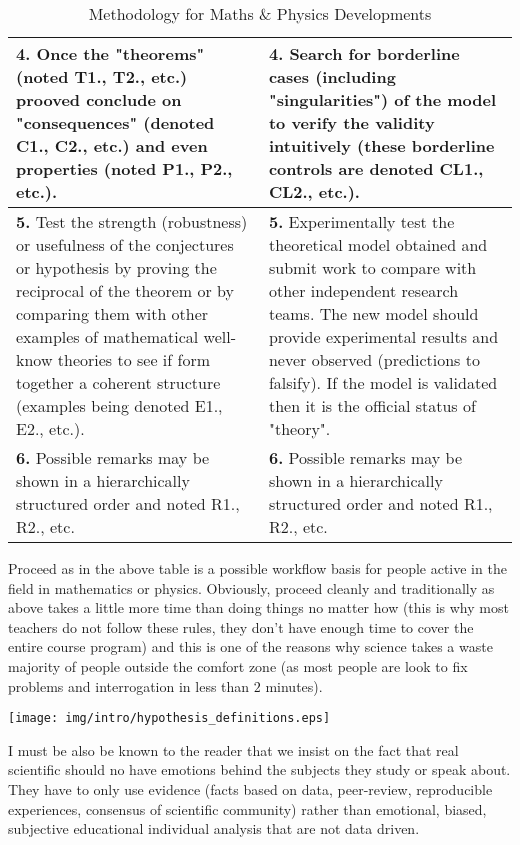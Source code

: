 \begin{table}[!ht]
\begin{center}
\begin{tabular}{|p{7.5cm}|p{7.5cm}|}
				\textbf{4.} Once the "theorems" (noted T1., T2., etc.) prooved conclude on "consequences" (denoted C1., C2., etc.) and even properties (noted P1., P2., etc.). & \textbf{4.} Search for borderline cases (including "singularities") of the model to verify the validity intuitively (these borderline controls are denoted CL1., CL2., etc.).\\ \hline
				\textbf{5.} Test the strength (robustness) or usefulness of the conjectures or hypothesis by proving the reciprocal of the theorem or by comparing them with other examples of mathematical well-know theories to see if form together a coherent structure (examples being denoted E1., E2., etc.). & \textbf{5.} Experimentally test the theoretical model obtained and submit work to compare with other independent research teams. The new model should provide experimental results and never observed (predictions to falsify). If the model is validated then it is the official status of "theory".\\ \hline
				\textbf{6.} Possible remarks may be shown in a hierarchically structured order and noted R1., R2., etc. & \textbf{6.} Possible remarks may be shown in a hierarchically structured order and noted R1., R2., etc.			
				\\ \hline
		\end{tabular}
	\end{center}
	\caption{Methodology for Maths \& Physics Developments}
	\end{table}	
	
Proceed as in the above table is a possible workflow basis for people active in the field in mathematics or physics. Obviously, proceed cleanly and traditionally as above takes a little more time than doing things no matter how (this is why most teachers do not follow these rules, they don't have enough time to cover the entire course program) and this is one of the reasons why science takes a waste majority of people outside the comfort zone (as most people are look to fix problems and interrogation in less than $2$ minutes).

\begin{center}
\texttt{[image: img/intro/hypothesis\_definitions.eps]}
\end{center}
I must be also be known to the reader that we insist on the fact that real scientific should no have emotions behind the subjects they study or speak about. They have to only use evidence (facts based on data, peer-review, reproducible experiences, consensus of scientific community) rather than emotional, biased, subjective educational individual analysis that are not data driven.

